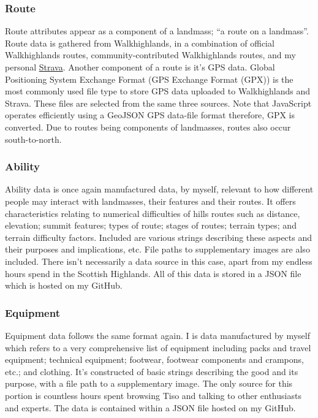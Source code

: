 \documentclass[11pt, english]{article}
\begin{document}
		\subsubsection{Route}

	Route attributes appear as a component of a landmass; ``a route on a landmass''. Route data is gathered from Walkhighlands, in a combination of official Walkhighlands routes, community-contributed Walkhighlands routes, and my personal \href{https://www.strava.com/athlete/training}{Strava}. Another component of a route is it's GPS data. Global Positioning System Exchange Format (GPS Exchange Format (GPX)) is the most commonly used file type to store GPS data uploaded to Walkhighlands and Strava. These files are selected from the same three sources. Note that JavaScript operates efficiently using a GeoJSON GPS data-file format therefore, GPX is converted. Due to routes being components of landmasses, routes also occur south-to-north.

		\subsubsection{Ability}

	Ability data is once again manufactured data, by myself, relevant to how different people may interact with landmasses, their features and their routes. It offers characteristics relating to numerical difficulties of hills routes such as distance, elevation; summit features; types of route; stages of routes; terrain types; and terrain difficulty factors. Included are various strings describing these aspects and their purposes and implications, etc. File paths to supplementary images are also included. There isn't necessarily a data source in this case, apart from my endless hours spend in the Scottish Highlands. All of this data is stored in a JSON file which is hosted on my GitHub.

		\subsubsection{Equipment}

	Equipment data follows the same format again. I is data manufactured by myself which refers to a very comprehensive list of equipment including packs and travel equipment; technical equipment; footwear, footwear components and crampons, etc.; and clothing. It's constructed of basic strings describing the good and its purpose, with a file path to a supplementary image. The only source for this portion is countless hours spent browsing Tiso and talking to other enthusiasts and experts. The data is contained within a JSON file hosted on my GitHub.
\end{document}
